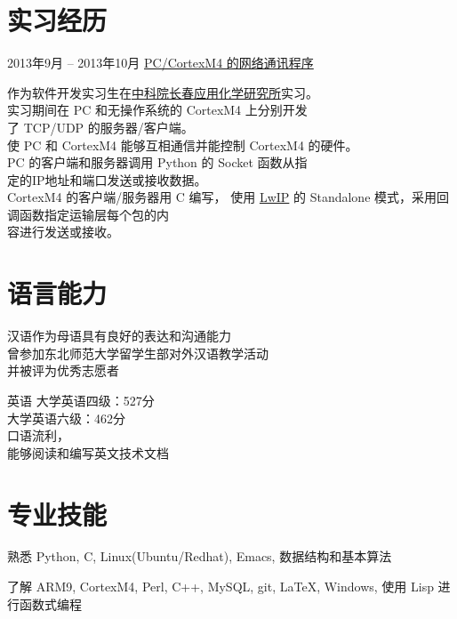 \documentclass{tccv}
\begin{document}
\section{\ShiShangZhongHeiJianTi 实习经历}

\begin{eventlist}
  

\item{\ShiShangZhongHeiJianTi 2013年9月 -- 2013年10月}
  {}
  {\href{https://github.com/YoungLeeNENU/Cortex-M4-LED-Control}{\VeraSansYuanTi PC/CortexM4 的网络通讯程序}}

  \HiraginoSansGB
  作为软件开发实习生在\href{http://www.ciac.jl.cn/}{中科院长春应用化学研究所}实习。\\
  实习期间在 PC 和无操作系统的 CortexM4 上分别开发 \\
  了 TCP/UDP 的服务器/客户端。\\
  使 PC 和 CortexM4 能够互相通信并能控制 CortexM4 的硬件。\\
  PC 的客户端和服务器调用 Python 的 Socket 函数从指 \\ 
  定的IP地址和端口发送或接收数据。\\
  CortexM4 的客户端/服务器用 C 编写，
  使用 \href{http://savannah.nongnu.org/projects/lwip/}{LwIP} 的 Standalone 模式，采用回调函数指定运输层每个包的内 \\
  容进行发送或接收。
\end{eventlist}

\section{\ShiShangZhongHeiJianTi 语言能力}

\begin{factlist}
\item{\HiraginoSansGB 汉语}{\HiraginoSansGB 作为母语具有良好的表达和沟通能力 \\
    曾参加东北师范大学留学生部对外汉语教学活动 \\ 
    并被评为优秀志愿者}
\item{\HiraginoSansGB 英语}{
    \HiraginoSansGB 大学英语四级：527分 \\
    \HiraginoSansGB 大学英语六级：462分 \\
    \HiraginoSansGB 口语流利，\\
    \HiraginoSansGB 能够阅读和编写英文技术文档
  }

\end{factlist}

\section{\ShiShangZhongHeiJianTi 专业技能}

\begin{factlist}

\item{\HiraginoSansGB 熟悉}{
    \HiraginoSansGB Python, C, Linux(Ubuntu/Redhat), Emacs, 数据结构和基本算法
  }

\item{\HiraginoSansGB 了解}{
    \HiraginoSansGB ARM9, CortexM4, Perl, C++, MySQL, git, \LaTeX, Windows, 使用 Lisp 进行函数式编程
  }
  
\end{factlist}
\end{document}
